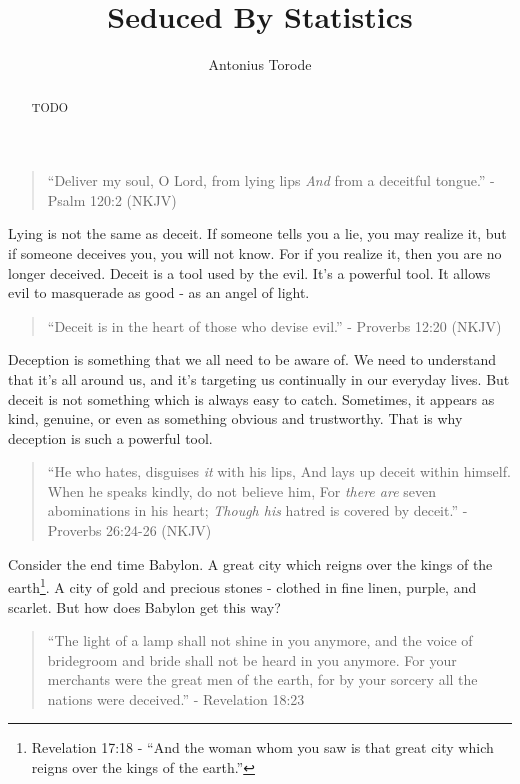 \documentclass[10pt]{article}
\title{Seduced By Statistics}
\author{Antonius Torode}
\begin{document}
\maketitle
\thispagestyle{fancy}


\begin{abstract}
TODO
\end{abstract}

\begin{multicols}{2}


\begin{quotation}
``Deliver my soul, O Lord, from lying lips \textit{And} from a deceitful tongue.'' - Psalm 120:2 (NKJV)
\end{quotation}

Lying is not the same as deceit. If someone tells you a lie, you may realize it, but if someone deceives you, you will not know. For if you realize it, then you are no longer deceived. Deceit is a tool used by the evil. It's a powerful tool. It allows evil to masquerade as good - as an angel of light. 

\begin{quotation}
``Deceit is in the heart of those who devise evil.'' - Proverbs 12:20 (NKJV)
\end{quotation}

Deception is something that we all need to be aware of. We need to understand that it's all around us, and it's targeting us continually in our everyday lives. But deceit is not something which is always easy to catch. Sometimes, it appears as kind, genuine, or even as something obvious and trustworthy. That is why deception is such a powerful tool.  

\begin{quotation}
``He who hates, disguises \textit{it} with his lips, And lays up deceit within himself. When he speaks kindly, do not believe him, For \textit{there are} seven abominations in his heart; \textit{Though his} hatred is covered by deceit.'' - Proverbs 26:24-26 (NKJV)
\end{quotation}

Consider the end time Babylon. A great city which reigns over the kings of the earth\footnote{Revelation 17:18 - ``And the woman whom you saw is that great city which reigns over the kings of the earth.''}. A city of gold and precious stones - clothed in fine linen, purple, and scarlet. But how does Babylon get this way?

\begin{quotation}
``The light of a lamp shall not shine in you anymore, and the voice of bridegroom and bride shall not be heard in you anymore. For your merchants were the great men of the earth, for by your sorcery all the nations were deceived.'' - Revelation 18:23
\end{quotation}


\end{multicols}
\end{document}
